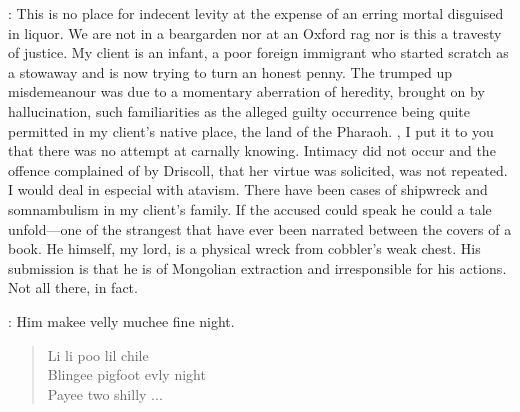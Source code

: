 
\JJOM:
This is no place for indecent levity at the
expense of an erring mortal disguised in liquor.
We are not in a beargarden nor at an Oxford rag
nor is this a travesty of justice.
My client is an infant, a poor foreign immigrant
who started scratch as a stowaway and is now trying to turn an honest penny.
The trumped up misdemeanour was due to a momentary aberration of heredity,
brought on by hallucination, such familiarities as the alleged guilty occurrence
being quite permitted in my client's native place, the land of the Pharaoh.
, I put it to you that there was no attempt at carnally knowing.
Intimacy did not occur and the offence complained of by Driscoll,
that her virtue was solicited, was not repeated.
I would deal in especial with atavism.
There have been cases of shipwreck and somnambulism in my client's family.
If the accused could speak he could a tale unfold—one
of the strangest that have ever been narrated between the covers of a book.
He himself, my lord, is a physical wreck from cobbler's weak chest.
His submission is that he is of Mongolian extraction
and irresponsible for his actions.
Not all there, in fact.

\Bloom:
Him makee velly muchee fine night.
\begin{verse}
    Li li poo lil chile\\
    Blingee pigfoot evly night\\
    Payee two shilly ...
\end{verse}


